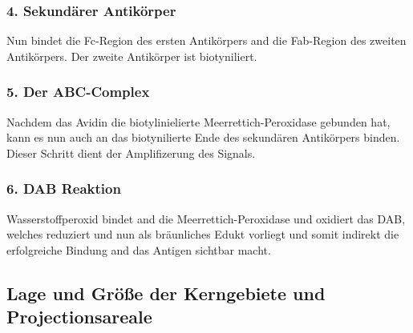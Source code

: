 \documentclass[12pt,a4paper,pdftex]{article}
\begin{document}
\subsubsection*{4. Sekundärer Antikörper}
Nun bindet die Fc-Region des ersten Antikörpers and die Fab-Region des zweiten Antikörpers. Der zweite Antikörper ist biotyniliert.

\subsubsection*{5. Der ABC-Complex}
Nachdem das Avidin die biotylinielierte Meerrettich-Peroxidase gebunden hat, kann es nun auch an das biotynilierte Ende des sekundären Antikörpers binden. Dieser Schritt dient der Amplifizerung des Signals.

\subsubsection*{6. DAB Reaktion}
Wasserstoffperoxid bindet and die Meerrettich-Peroxidase und oxidiert das DAB, welches reduziert und nun als bräunliches Edukt vorliegt und somit indirekt die erfolgreiche Bindung and das Antigen sichtbar macht.

\subsection{Lage und Größe der Kerngebiete und Projectionsareale}
\end{document}
